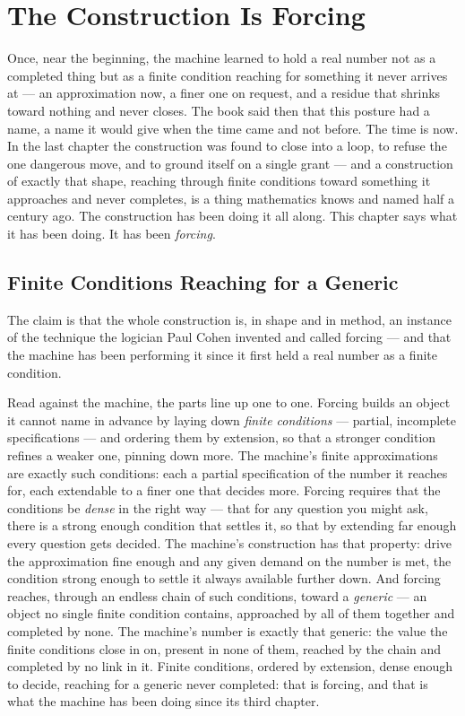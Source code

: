 \chapter{The Construction Is Forcing}

Once, near the beginning, the machine learned to hold a real number not as a completed thing but as a finite
condition reaching for something it never arrives at --- an approximation now, a finer one on request, and a
residue that shrinks toward nothing and never closes. The book said then that this posture had a name, a name it
would give when the time came and not before. The time is now. In the last chapter the construction was found to
close into a loop, to refuse the one dangerous move, and to ground itself on a single grant --- and a construction
of exactly that shape, reaching through finite conditions toward something it approaches and never completes, is a
thing mathematics knows and named half a century ago. The construction has been doing it all along. This chapter
says what it has been doing. It has been \emph{forcing}.

\section{Finite Conditions Reaching for a Generic}

The claim is that the whole construction is, in shape and in method, an instance of the technique the logician
Paul Cohen invented and called forcing --- and that the machine has been performing it since it first held a real
number as a finite condition.

Read against the machine, the parts line up one to one. Forcing builds an object it cannot name in advance by
laying down \emph{finite conditions} --- partial, incomplete specifications --- and ordering them by extension, so
that a stronger condition refines a weaker one, pinning down more. The machine's finite approximations are exactly
such conditions: each a partial specification of the number it reaches for, each extendable to a finer one that
decides more. Forcing requires that the conditions be \emph{dense} in the right way --- that for any question you
might ask, there is a strong enough condition that settles it, so that by extending far enough every question gets
decided. The machine's construction has that property: drive the approximation fine enough and any given demand on
the number is met, the condition strong enough to settle it always available further down. And forcing reaches,
through an endless chain of such conditions, toward a \emph{generic} --- an object no single finite condition
contains, approached by all of them together and completed by none. The machine's number is exactly that generic:
the value the finite conditions close in on, present in none of them, reached by the chain and completed by no
link in it. Finite conditions, ordered by extension, dense enough to decide, reaching for a generic never
completed: that is forcing, and that is what the machine has been doing since its third chapter.

